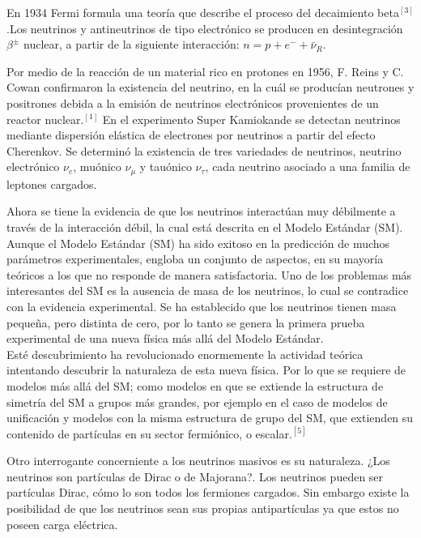 \documentclass[12pt]{article}
\begin{document}
 En 1934 Fermi formula una teoría que describe el proceso del decaimiento beta$^{[3]}$.Los neutrinos y antineutrinos de tipo electrónico se producen en desintegración $\beta^{\pm}$ nuclear, a partir de la siguiente interacción: $n = p + e^- + \bar{\nu}_R$. 

 Por medio de la reacción de un material rico en protones en 1956, F. Reins y C. Cowan  confirmaron la existencia del neutrino, en la cuál se producían neutrones y positrones debida a la emisión de neutrinos electrónicos provenientes de un reactor nuclear.$^{[1]}$
 En el experimento Super Kamiokande se detectan neutrinos mediante dispersión elástica de electrones por neutrinos a partir del efecto Cherenkov. Se determinó la existencia de tres variedades de neutrinos, neutrino electrónico $\nu_e$, muónico  $\nu_\mu$ y tauónico $\nu_\tau$, cada neutrino asociado a una familia de leptones cargados.

Ahora se tiene la evidencia de que los neutrinos interactúan muy débilmente a través de la interacción débil, la cual está descrita en el Modelo Estándar (SM).  Aunque el Modelo Estándar (SM) ha sido exitoso en la predicción de muchos parámetros experimentales, engloba un conjunto de aspectos, en su mayoría teóricos a los que no responde de manera satisfactoria. Uno de los problemas más interesantes del SM es la ausencia de masa de los neutrinos, lo cual se contradice con la evidencia experimental. Se ha establecido que los neutrinos tienen masa pequeña, pero distinta de cero, por lo tanto se genera la primera prueba experimental de una nueva física más allá del Modelo Estándar.\\ 
 
 Esté descubrimiento ha revolucionado enormemente la actividad teórica intentando descubrir la naturaleza de esta nueva física. Por lo que se requiere de modelos más allá del SM; como modelos en que se extiende la estructura de simetría del SM a grupos más grandes, por ejemplo en el caso de modelos de unificación y modelos con la misma estructura de grupo del SM, que extienden su contenido de partículas en su sector fermiónico, o escalar.$^{[5]}$ 

Otro interrogante concerniente a los neutrinos masivos es su naturaleza. ¿Los neutrinos son partículas de Dirac o de Majorana?. Los neutrinos pueden ser partículas Dirac, cómo lo son todos los fermiones cargados. Sin embargo existe la posibilidad de que los neutrinos sean sus propias antipartículas ya que estos no poseen carga eléctrica.  \\
\end{document}
